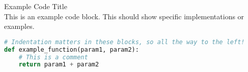 \begin{examplecode}{Example Code Title}\\
    This is an example code block. This should show specific implementations or examples.
\begin{lstlisting}[language=Python, style=basesmol]
# Indentation matters in these blocks, so all the way to the left!
def example_function(param1, param2):
    # This is a comment
    return param1 + param2
\end{lstlisting}
\end{examplecode}




        

    





